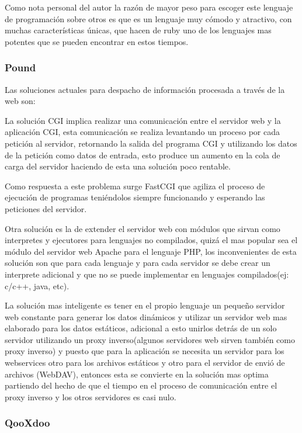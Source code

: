 Como nota personal del autor la razón de mayor peso para escoger este lenguaje de programación sobre otros es que es un lenguaje muy cómodo y atractivo, con muchas características únicas, que hacen de ruby uno de los lenguajes mas potentes que se pueden encontrar en estos tiempos.


\subsubsection*{Pound \cite{pound} }
\label{tec:pound}

Las soluciones actuales para despacho de información procesada a través de la web son:

La solución CGI implica realizar una comunicación entre el servidor web y la aplicación CGI, esta comunicación se realiza levantando un proceso por cada petición al servidor, retornando la salida del programa CGI y utilizando los datos de la petición como datos de entrada, esto produce un aumento en la cola de carga del servidor haciendo de esta una solución poco rentable.

Como respuesta a este problema surge FastCGI que agiliza el proceso de ejecución de programas teniéndolos siempre funcionando y esperando las peticiones del servidor.

Otra solución es la de extender el servidor web con módulos que sirvan como interpretes y ejecutores para lenguajes no compilados, quizá el mas popular sea el módulo del servidor web Apache para el lenguaje PHP, los inconvenientes de esta solución son que para cada lenguaje y para cada servidor se debe crear un interprete adicional y que no se puede implementar en lenguajes compilados(ej: c/c++, java, etc).

La solución mas inteligente es tener en el propio lenguaje un pequeño servidor web constante para generar los datos dinámicos y utilizar un servidor web mas elaborado para los datos estáticos, adicional a esto unirlos detrás de un solo servidor utilizando un proxy inverso(algunos servidores web sirven también como proxy inverso) y puesto que para la aplicación se necesita un servidor para los webservices otro para los archivos estáticos y otro para el servidor de envió de archivos (WebDAV), entonces esta se convierte en la solución mas optima partiendo del hecho de que el tiempo en el proceso de comunicación entre el proxy inverso y los otros servidores es casi nulo.


\subsubsection*{QooXdoo \cite{qooxdoo} }
\label{tec:qooxdoo}


